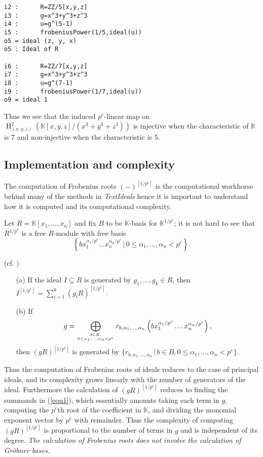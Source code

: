 \documentclass[11pt]{amsart}
\DeclareMathOperator{\HH}{H}
\begin{document}
\begin{verbatim}
i2 :      R=ZZ/5[x,y,z]
i3 :      g=x^3+y^3+z^3
i4 :      u=g^(5-1)
i5 :      frobeniusPower(1/5,ideal(u))
o5 = ideal (z, y, x)
o5 : Ideal of R

i6 :      R=ZZ/7[x,y,z]
i7 :      g=x^3+y^3+z^3
i8 :      u=g^(7-1)
i9 :      frobeniusPower(1/7,ideal(u))
o9 = ideal 1
\end{verbatim}

Thus we see that the induced $p^{e}$-linear map on $\HH_{(x,y,z)}^{2} \left( \mathbb{K}[x,y,z]/(x^3+y^3+z^3) \right)$ is injective
when the characteristic of $\mathbb{K}$ is $7$ and non-injective when the characteristic is $5$.

\subsection{Implementation and complexity}

The computation of Frobenius roots $(-)^{[1/p^e]}$ is the computational workhorse behind many of the methods in \emph{TestIdeals}
hence it is important to understand how it is computed and its computational complexity.

Let $R=\mathbb{K}[x_1, \dots, x_n]$ and fix $B$ to be $\mathbb{K}$-basis for $\mathbb{K}^{1/p^e}$;
it is not hard to see that $R^{1/p^e}$ is a free $R$-module with free basis
$$\left\{ b x_1^{\alpha_1/p^e} \dots x_n^{\alpha_n/p^e} \,|\, 0\leq \alpha_1, \dots, \alpha_n < p^e \right\}.$$

\begin{proposition}(cf. \cite[\S 5]{KatzmanParameterTestIdealOfCMRings})
\begin{enumerate}
\item[(a)] If the ideal $I\subseteq R$ is generated by $g_1, \dots, g_k\in R$, then $I^{[1/p^e]}=\sum_{i=1}^k (g_i R)^{[1/p^e]}$.
\item[(b)] If
\begin{equation}\label{eqn1}
g=\bigoplus_{b\in B, \atop{0\leq \alpha_1, \dots, \alpha_n < p^e}} r_{b, \alpha_1, \dots, \alpha_n} \left(b x_1^{\alpha_1/p^e} \dots x_n^{\alpha_n/p^e}\right),
\end{equation}
then $(gR)^{[1/p^e]}$ is generated by $\{ r_{b, \alpha_1, \dots, \alpha_n} \,|\, b\in B, 0\leq \alpha_1, \dots, \alpha_n < p^e \}$.
\end{enumerate}
\end{proposition}

Thus the computation of Frobenius roots of ideals reduces to the case of principal ideals, and its complexity grows linearly with the number of generators of the ideal.
Furthermore the calculation of  $(gR)^{[1/p^e]}$ reduces to finding the summands in (\ref{eqn1}), which essentially amounts
taking each term in $g$, computing the $p^e$th root of the coefficient in $\mathbb{K}$, and dividing the monomial exponent vector by $p^e$ with remainder.
Thus the complexity of  computing $(gR)^{[1/p^e]}$ is proportional to the number of terms in $g$ and is independent of its degree.
\emph{The calculation of Frobenius roots does not involve the calculation of Gr\"obner bases.}
\end{document}
